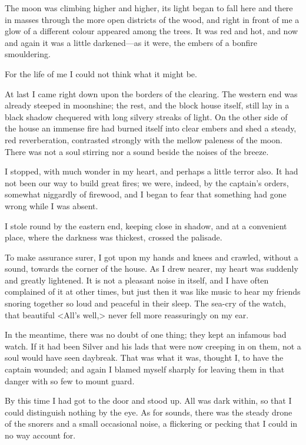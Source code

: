 The moon was climbing higher and higher, its light began to fall here and there in masses through the more open districts of the wood, and right in front of me a glow of a different colour appeared among the trees. It was red and hot, and now and again it was a little darkened—as it were, the embers of a bonfire smouldering.

For the life of me I could not think what it might be.

At last I came right down upon the borders of the clearing. The western end was already steeped in moonshine; the rest, and the block house itself, still lay in a black shadow chequered with long silvery streaks of light. On the other side of the house an immense fire had burned itself into clear embers and shed a steady, red reverberation, contrasted strongly with the mellow paleness of the moon. There was not a soul stirring nor a sound beside the noises of the breeze.

I stopped, with much wonder in my heart, and perhaps a little terror also. It had not been our way to build great fires; we were, indeed, by the captain's orders, somewhat niggardly of firewood, and I began to fear that something had gone wrong while I was absent.

I stole round by the eastern end, keeping close in shadow, and at a convenient place, where the darkness was thickest, crossed the palisade.

To make assurance surer, I got upon my hands and knees and crawled, without a sound, towards the corner of the house. As I drew nearer, my heart was suddenly and greatly lightened. It is not a pleasant noise in itself, and I have often complained of it at other times, but just then it was like music to hear my friends snoring together so loud and peaceful in their sleep. The sea-cry of the watch, that beautiful <All's well,> never fell more reassuringly on my ear.

In the meantime, there was no doubt of one thing; they kept an infamous bad watch. If it had been Silver and his lads that were now creeping in on them, not a soul would have seen daybreak. That was what it was, thought I, to have the captain wounded; and again I blamed myself sharply for leaving them in that danger with so few to mount guard.

By this time I had got to the door and stood up. All was dark within, so that I could distinguish nothing by the eye. As for sounds, there was the steady drone of the snorers and a small occasional noise, a flickering or pecking that I could in no way account for.

